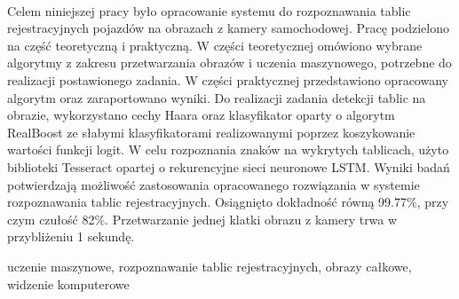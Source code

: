 %


\begin{center}
    \\[1cm]
\end{center}
Celem niniejszej pracy było opracowanie systemu do rozpoznawania tablic rejestracyjnych pojazdów na obrazach z kamery samochodowej.
Pracę podzielono na część teoretyczną i praktyczną.
W części teoretycznej omówiono wybrane algorytmy z zakresu przetwarzania obrazów i uczenia maszynowego, potrzebne do realizacji postawionego zadania.
W części praktycznej przedstawiono opracowany algorytm oraz zaraportowano wyniki.
Do realizacji zadania detekcji tablic na obrazie, wykorzystano cechy Haara oraz klasyfikator oparty o algorytm RealBoost ze słabymi klasyfikatorami realizowanymi poprzez koszykowanie wartości funkcji logit.
W celu rozpoznania znaków na wykrytych tablicach, użyto biblioteki Tesseract opartej o rekurencyjne sieci neuronowe LSTM\@.
Wyniki badań potwierdzają możliwość zastosowania opracowanego rozwiązania w systemie rozpoznawania tablic rejestracyjnych.
Osiągnięto dokładność równą 99.77\%, przy czym czułość 82\%.
Przetwarzanie jednej klatki obrazu z kamery trwa w przybliżeniu 1 sekundę.


\vspace{10pt}
 uczenie maszynowe, rozpoznawanie tablic rejestracyjnych, obrazy całkowe, widzenie komputerowe

\vfill


